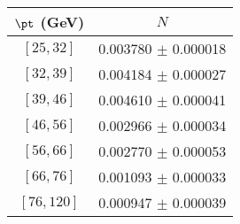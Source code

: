 \begin{tabular}{c||c}
$\pt$ (GeV) & $N$  \\
\hline
$[25, 32]$ & 0.003780 $\pm$ 0.000018\\
$[32, 39]$ & 0.004184 $\pm$ 0.000027\\
$[39, 46]$ & 0.004610 $\pm$ 0.000041\\
$[46, 56]$ & 0.002966 $\pm$ 0.000034\\
$[56, 66]$ & 0.002770 $\pm$ 0.000053\\
$[66, 76]$ & 0.001093 $\pm$ 0.000033\\
$[76, 120]$ & 0.000947 $\pm$ 0.000039\\
\end{tabular}

